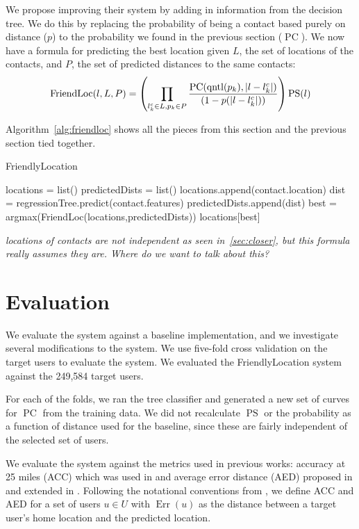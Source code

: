 \documentclass[letterpaper]{article}
\DeclareMathOperator{\pContact}{PC}
\DeclareMathOperator{\pStrangers}{PS}
\DeclareMathOperator{\FriendLoc}{FriendLoc}
\DeclareMathOperator{\Err}{Err}
\DeclareMathOperator{\quantile}{qntl}
\newcommand{\jam}[1]{\emph{#1}}
\newcommand{\flchap}[1]{\section{#1}}
\begin{document}
We propose improving their system by adding in information from the decision
tree.
%
We do this by replacing the probability of being a contact based purely on
distance ($p$) to the probability we found in the previous section
($\pContact$).
%
We now have a formula for predicting the best location given $L$, the set of
locations of the contacts, and $P$, the set of predicted distances to the same
contacts:
\[
    \FriendLoc(l,L,P) =
        \left(
            \prod_{l^c_k \in L,p_k \in P}
            {\pContact(\quantile(p_k),|l-l^c_k|) \over (1-p(|l-l^c_k|))}
        \right)
        \pStrangers(l)
\]

Algorithm~\ref{alg:friendloc} shows all the pieces from this section and the
previous section tied together.

\begin{algorithm}
  \caption{FriendlyLocation \label{alg:friendloc}}
  \begin{algorithmic}[0]
  \State locations = list()
  \State predictedDists = list()
        \State \Continue
      \EndIf
      \State locations.append(contact.location)
      \State dist = regressionTree.predict(contact.features)
      \State predictedDists.append(dist)
  \EndFor
  \State best = argmax(FriendLoc(locations,predictedDists))
  \State \Return locations[best]
  \end{algorithmic}
\end{algorithm}

\jam{locations of contacts are not independent as seen in~\ref{sec:closer}, but
this formula really assumes they are. Where do we want to talk about this?}

\flchap{Evaluation}
\label{chap:eval}

We evaluate the system against a baseline implementation, and we investigate
several modifications to the system.
%
We use five-fold cross validation on the target users to evaluate the system.
We evaluated the FriendlyLocation system against the 249,584 target users.

For each of the folds, we ran the tree classifier and generated a new set of
curves for $\pContact$ from the training data.
%
We did not recalculate $\pStrangers$ or the probability as a function of distance
used for the baseline, since these are fairly independent of the selected set
of users.

We evaluate the system against the metrics used in previous works:
accuracy at 25 miles (ACC) which was used in \cite{backstrom2010find}
and average error distance (AED) proposed in \cite{cheng2010you} and
extended in \cite{li2012towards}.
%
Following the notational conventions from \cite{li2012towards}, we define ACC
and AED for a set of users $u \in U$ with $\Err(u)$ as the distance between a
target user's home location and the predicted location.
\end{document}
